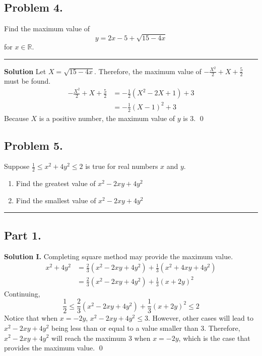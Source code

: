 \documentclass{article}
\newenvironment{solution}{\begin{trivlist}\item[]{\bf Solution}}{\qed \end{trivlist}}
\newcommand{\MyLine}{\noindent\rule{0.99\textwidth}{0.4pt}}
\begin{document}
\subsection*{Problem 4.}
{\color {Gray}
Find the maximum value of
\[
y = 2x - 5 + \sqrt{15 - 4x}
\]
for $x \in \mathbb{R}$.
}

\MyLine
\begin{solution}
Let $X = \sqrt{15 - 4x}$. Therefore, the maximum value
of $-\frac{X^2}{2} + X + \frac{5}{2}$ must be found.
\begin{align*}
    -\frac{X^2}{2} + X + \frac{5}{2}
    &= -\frac{1}{2} \left( X^2 -2X + 1 \right) + 3 \\
    &= -\frac{1}{2} \left( X - 1 \right)^2 + 3
\end{align*}
Because $X$ is a positive number, the maximum value of
$y$ is $\boxed{3}$.
\end{solution}

\subsection*{Problem 5.}
{\color {Gray}
Suppose $\frac{1}{2} \leq x^2 + 4y^2 \leq 2$ is true for
real numbers $x$ and $y$.
\begin{enumerate}
    \item Find the greatest value of $x^2 - 2xy + 4y^2$
    \item Find the smallest value of $x^2 - 2xy + 4y^2$
\end{enumerate}
}
\MyLine
\subsection*{Part 1.}
\textbf{Solution I.} Completing square method may provide
the maximum value.
\begin{align*}
    x^2 + 4y^2
    &= \frac{2}{3} \left( x^2 - 2xy + 4y^2 \right)
        + \frac{1}{3} \left( x^2 + 4xy + 4y^2 \right) \\
    &= \frac{2}{3} \left( x^2 - 2xy + 4y^2 \right)
        + \frac{1}{3} (x + 2y)^2
\end{align*}
Continuing,
\[
\frac{1}{2}
\leq \frac{2}{3} \left( x^2 - 2xy + 4y^2 \right)
    + \frac{1}{3} (x + 2y)^2
\leq 2
\]
Notice that when $x = -2y$, $x^2 - 2xy + 4y^2 \leq 3$.
However, other cases will lead to $x^2 - 2xy + 4y^2$ being
less than or equal to a value smaller than $3$. Therefore,
$x^2 - 2xy + 4y^2$ will reach the maximum $3$ when $x = -2y$,
which is the case that provides the maximum value.
\qed
\end{document}
